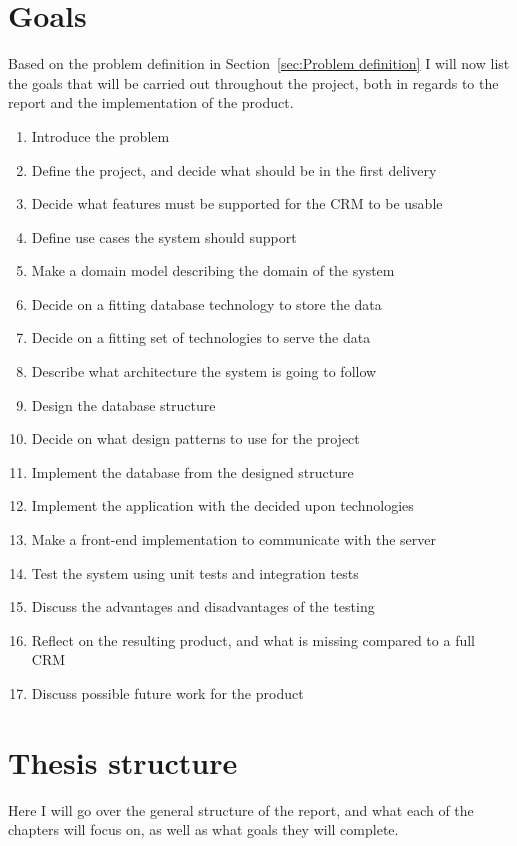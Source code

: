 \section{Goals}
\label{sec:Goals}
Based on the problem definition in Section~\ref{sec:Problem definition} I will
now list the goals that will be carried out throughout the project, both in
regards to the report and the implementation of the product. 

\begin{enumerate}
  \item Introduce the problem
  \item Define the project, and decide what should be in the first delivery
  \item Decide what features must be supported for the CRM to be usable
  \item Define use cases the system should support
  \item Make a domain model describing the domain of the system
  \item Decide on a fitting database technology to store the data
  \item Decide on a fitting set of technologies to serve the data
  \item Describe what architecture the system is going to follow
  \item Design the database structure
  \item Decide on what design patterns to use for the project
  \item Implement the database from the designed structure
  \item Implement the application with the decided upon technologies
  \item Make a front-end implementation to communicate with the server
  \item Test the system using unit tests and integration tests
  \item Discuss the advantages and disadvantages of the testing
  \item Reflect on the resulting product, and what is missing compared to a full CRM
  \item Discuss possible future work for the product
\end{enumerate}

\section{Thesis structure}
\label{sec:Thesis structure}
Here I will go over the general structure of the report, and what each of the
chapters will focus on, as well as what goals they will complete.\\ 

